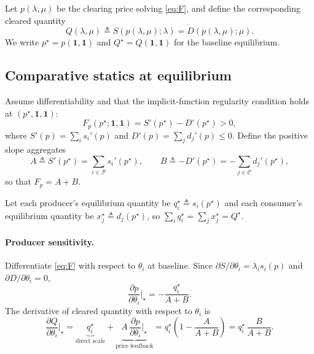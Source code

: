 \documentclass[journal, a4paper]{IEEEtran}
\begin{document}
Let $p(\lambda,\mu)$ be the clearing price solving \eqref{eq:F}, and define the corresponding cleared quantity
\begin{equation}
Q(\lambda,\mu)\triangleq S(p(\lambda,\mu);\lambda)=D(p(\lambda,\mu);\mu).
\end{equation}
We write $p^\star=p(\mathbf{1},\mathbf{1})$ and $Q^\star=Q(\mathbf{1},\mathbf{1})$ for the baseline equilibrium.

\subsection{Comparative statics at equilibrium}
Assume differentiability and that the implicit-function regularity condition holds at $(p^\star,\mathbf{1},\mathbf{1})$:
\begin{equation}
F_p(p^\star;\mathbf{1},\mathbf{1})=S'(p^\star)-D'(p^\star)>0,
\end{equation}
where $S'(p)=\sum_{i} s_i'(p)$ and $D'(p)=\sum_{j} d_j'(p)\le 0$. Define the positive slope aggregates
\begin{equation}
A \triangleq S'(p^\star)=\sum_{i\in\mathcal{P}} s_i'(p^\star),\qquad
B \triangleq -D'(p^\star)= -\sum_{j\in\mathcal{C}} d_j'(p^\star),
\label{eq:AB}
\end{equation}
so that $F_p=A+B$.

Let each producer's equilibrium quantity be $q_i^\star \triangleq s_i(p^\star)$ and each consumer's equilibrium quantity be $x_j^\star \triangleq d_j(p^\star)$, so $\sum_i q_i^\star=\sum_j x_j^\star=Q^\star$.

\paragraph{Producer sensitivity.}
Differentiate \eqref{eq:F} with respect to $\theta_i$ at baseline. Since $\partial S/\partial \theta_i=\lambda_i s_i(p)$ and $\partial D/\partial \theta_i=0$,
\begin{equation}
\frac{\partial p}{\partial \theta_i}\Big|_\star = -\frac{q_i^\star}{A+B}.
\label{eq:dp_dtheta}
\end{equation}
The derivative of cleared quantity with respect to $\theta_i$ is
\begin{equation}
\frac{\partial Q}{\partial \theta_i}\Big|_\star
=
\underbrace{q_i^\star}_{\text{direct scale}}
+
\underbrace{A\,\frac{\partial p}{\partial \theta_i}\Big|_\star}_{\text{price feedback}}
=
q_i^\star\left(1-\frac{A}{A+B}\right)
=
q_i^\star\,\frac{B}{A+B}.
\label{eq:dQ_dtheta}
\end{equation}
\end{document}
